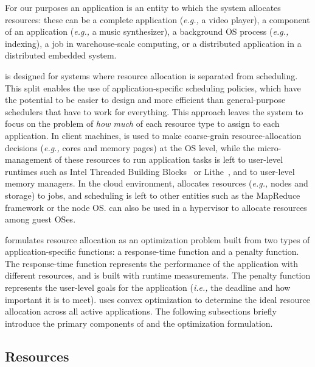 For our purposes an application is an entity to which the system
allocates resources: these can be a complete application (\emph{e.g.,}
a video player), a component of an application (\emph{e.g.,} a music
synthesizer), a background OS process (\emph{e.g.,} indexing), a job
in warehouse-scale computing, or a distributed application in a
distributed embedded system.

\pacora is designed for systems where resource allocation is separated
from scheduling.  This split enables the use of application-specific
scheduling policies, which have the potential to be easier to design
and more efficient than general-purpose schedulers that have to work
for everything.  This approach leaves the system to focus on the
problem of \emph{how much} of each resource type to assign to each
application.  In client machines, \pacora is used to make coarse-grain
resource-allocation decisions (\emph{e.g.,} cores and memory pages) at
the OS level, while the micro-management of these resources to run
application tasks is left to user-level runtimes such as Intel
Threaded Building Blocks~\cite{CoMa08} or Lithe~\cite{lithe}, and to
user-level memory managers.
In the cloud environment, \pacora allocates
resources (\emph{e.g.,} nodes and storage) to jobs, and scheduling is
left to other entities such as the MapReduce framework\cite{mapreduce}
or the node OS.  \pacora can also be used in a hypervisor to allocate
resources among guest OSes.

\pacora formulates resource allocation as an optimization problem
built from two types of application-specific functions: a
response-time function and a penalty function. The response-time
function represents the performance of the application with different
resources, and is built with runtime measurements.  The penalty
function represents the user-level goals for the application
(\emph{i.e.,} the deadline and how important it is to meet). \pacora uses convex optimization\cite{BoVa} to
determine the ideal resource allocation across all active
applications.  The following subsections briefly introduce the primary
components of \pacora and the optimization formulation.

\subsection{Resources}

